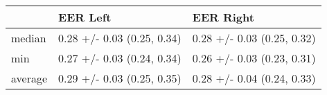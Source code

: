 \begin{tabular}{lll}
\toprule
{} &                    EER Left &                   EER Right \\
\midrule
median  &  0.28 +/- 0.03 (0.25, 0.34) &  0.28 +/- 0.03 (0.25, 0.32) \\
min     &  0.27 +/- 0.03 (0.24, 0.34) &  0.26 +/- 0.03 (0.23, 0.31) \\
average &  0.29 +/- 0.03 (0.25, 0.35) &  0.28 +/- 0.04 (0.24, 0.33) \\
\bottomrule
\end{tabular}
